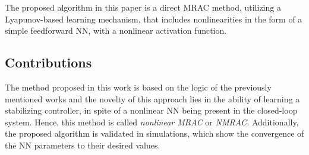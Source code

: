 
The proposed algorithm in this paper is a direct MRAC method, utilizing a Lyapunov-based learning mechanism, that includes nonlinearities in the form of a simple feedforward NN, with a nonlinear activation function.

\subsection{Contributions}
\label{sec:contributions}
The method proposed in this work is based on the logic of the previously mentioned works and the novelty of this approach lies in the ability of learning a stabilizing controller, in spite of a nonlinear NN being present in the closed-loop system. Hence, this method is called \textit{nonlinear MRAC} or \textit{NMRAC}. Additionally, the proposed algorithm is validated in simulations, which show the convergence of the NN parameters to their desired values.